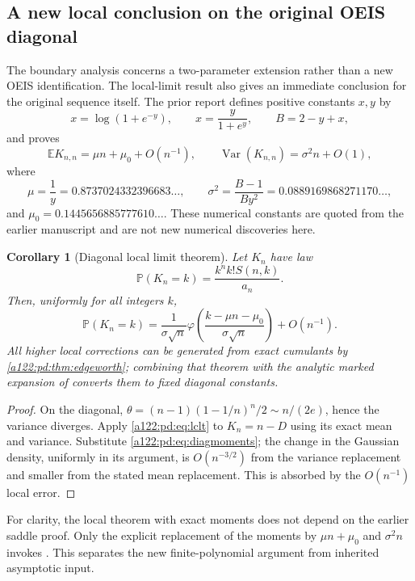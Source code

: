 \documentclass[11pt,letterpaper]{article}
\numberwithin{equation}{subsection}
\newtheorem{corollary}[theorem]{Corollary}
\theoremstyle{definition}
\theoremstyle{remark}
\theoremstyle{plain}
\newcommand{\E}{\mathbb E}
\newcommand{\Prob}{\mathbb P}
\newcommand{\Var}{\operatorname{Var}}
\begin{document}
\subsection{A new local conclusion on the original OEIS diagonal}
\label{a122:pd:sec:diagonal}
The boundary analysis concerns a two-parameter extension rather than a
new OEIS identification. The local-limit result also gives an immediate
conclusion for the original sequence itself.
The prior report \cite{a122:pd:repo} defines positive constants $x,y$ by
\begin{equation}\label{a122:pd:eq:diagsaddle}
 x=\log(1+e^{-y}),\qquad x=\frac{y}{1+e^y},\qquad B=2-y+x,
\end{equation}
and proves
\begin{equation}\label{a122:pd:eq:diagmoments}
 \E K_{n,n}=\mu n+\mu_0+O(n^{-1}),\qquad
 \Var(K_{n,n})=\sigma^2n+O(1),
\end{equation}
where
\[
 \mu=\frac1y=0.8737024332396683\ldots,\qquad
 \sigma^2=\frac{B-1}{By^2}=0.0889169868271170\ldots,
\]
and $\mu_0=0.1445656885777610\ldots$.
These numerical constants are quoted from the earlier manuscript and
are not new numerical discoveries here.

\begin{corollary}[Diagonal local limit theorem]\label{a122:pd:cor:diaglclt}
Let $K_n$ have law
\[
 \Prob(K_n=k)=\frac{k^n k!S(n,k)}{a_n}.
\]
Then, uniformly for all integers $k$,
\begin{equation}\label{a122:pd:eq:diaglclt}
 \Prob(K_n=k)=\frac1{\sigma\sqrt n}
 \varphi\!\left(\frac{k-\mu n-\mu_0}{\sigma\sqrt n}\right)
 +O(n^{-1}).
\end{equation}
All higher local corrections can be generated from exact cumulants by
\cref{a122:pd:thm:edgeworth}; combining that theorem with the analytic marked
expansion of \cite{a122:pd:repo} converts them to fixed diagonal constants.
\end{corollary}
\begin{proof}
On the diagonal,
$\theta=(n-1)(1-1/n)^n/2\sim n/(2e)$, hence the variance diverges.
Apply \eqref{a122:pd:eq:lclt} to $K_n=n-D$ using its exact mean and variance.
Substitute \eqref{a122:pd:eq:diagmoments}; the change in the Gaussian density,
uniformly in its argument, is $O(n^{-3/2})$ from the variance replacement
and smaller from the stated mean replacement. This is absorbed by the
$O(n^{-1})$ local error.
\end{proof}

For clarity, the local theorem with exact moments does not depend on the
earlier saddle proof. Only the explicit replacement of the moments by
$\mu n+\mu_0$ and $\sigma^2n$ invokes \cite{a122:pd:repo}.
This separates the new finite-polynomial argument from inherited
asymptotic input.
\end{document}
